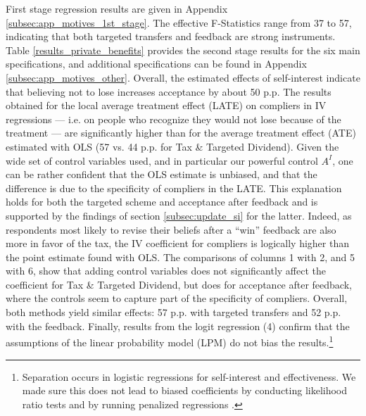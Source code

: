 \documentclass[11pt]{article}
\begin{document}
First stage regression results are given in Appendix \ref{subsec:app_motives_1st_stage}. The effective F-Statistics \citep{montiel_pflueger_2013} range from 37 to 57, indicating that both targeted transfers and feedback are strong instruments. Table \ref{results_private_benefits} provides the second stage results for the six main specifications, and additional specifications can be found in Appendix \ref{subsec:app_motives_other}. Overall, the estimated effects of self-interest indicate that believing not to lose increases acceptance by about 50 p.p. The results obtained for the local average treatment effect (LATE) on compliers in IV regressions --- i.e. on people who recognize they would not lose because of the treatment --- are significantly higher than for the average treatment effect (ATE) estimated with OLS (57 vs. 44 p.p. for Tax \& Targeted Dividend). Given the wide set of control variables used, and in particular our powerful control $A^I$, one can be rather confident that the OLS estimate is unbiased, and that the difference is due to the specificity of compliers in the LATE. This explanation holds for both the targeted scheme and acceptance after feedback and is supported by the findings of section \ref{subsec:update_si} for the latter. Indeed, as respondents most likely to revise their beliefs after a ``win'' feedback are also more in favor of the tax, the IV coefficient for compliers is logically higher than the point estimate found with OLS. The comparisons of columns 1 with 2, and 5 with 6, show that adding control variables does not significantly affect the coefficient for Tax \& Targeted Dividend, but does for acceptance after feedback, where the controls seem to capture part of the specificity of compliers. Overall, both methods yield similar effects: 57 p.p. with targeted transfers and 52 p.p. with the feedback. Finally, results from the logit regression (4) confirm that the assumptions of the linear probability model (LPM) do not bias the results.\footnote{Separation occurs in logistic regressions for self-interest and effectiveness. We made sure this does not lead to biased coefficients by conducting likelihood ratio tests and by running penalized regressions \citep{firth_bias_1993,heinze_fixing_2003}. }
\end{document}
